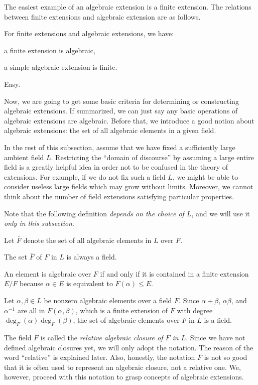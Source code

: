 \documentclass{../note}
\begin{document}
The easiest example of an algebraic extension is a finite extension.
The relations between finite extensions and algebraic extension are as follows.

\begin{prop}
For finite extensions and algebraic extensions, we have:
\begin{parts}
\item a finite extension is algebraic,
\item a simple algebraic extension is finite.
\end{parts}
\end{prop}
\begin{pf} Easy. \end{pf}

Now, we are going to get some basic criteria for determining or constructing algebraic extensions.
If summarized, we can just say any basic operations of algebraic extensions are algebraic.
Before that, we introduce a good notion about algebraic extensions: the set of all algebraic elements in a given field.

In the rest of this subsection, assume that we have fixed a sufficiently large ambient field $L$.
Restricting the ``domain of discourse'' by assuming a large entire field is a greatly helpful idea in order not to be confused in the theory of extensions.
For example, if we do not fix such a field $L$, we might be able to consider useless large fields which may grow without limits.
Moreover, we cannot think about the number of field extensions satisfying particular properties.

Note that the following definition \emph{depends on the choice of $L$}, and we will use it \emph{only in this subsection}.
\begin{defn}
Let $\bar F$ denote the set of all algebraic elements in $L$ over $F$.
\end{defn}
\begin{prop}
The set $\bar F$ of $F$ in $L$ is always a field.
\end{prop}
\begin{pf}
An element is algebraic over $F$ if and only if it is contained in a finite extension $E/F$ because $\alpha\in E$ is equivalent to $F(\alpha)\le E$.

Let $\alpha,\beta\in L$ be nonzero algebraic elements over a field $F$.
Since $\alpha+\beta$, $\alpha\beta$, and $\alpha^{-1}$ are all in $F(\alpha,\beta)$, which is a finite extension of $F$ with degree $\deg_F(\alpha)\deg_F(\beta)$, the set of algebraic elements over $F$ in $L$ is a field.
\end{pf}
\begin{rmk}
The field $\bar F$ is called the \emph{relative algebraic closure of $F$ in $L$}.
Since we have not defined algebraic closures yet, we will only adopt the notation.
The reason of the word ``relative'' is explained later.
Also, honestly, the notation $\bar F$ is not so good that it is often used to represent an algebraic closure, not a relative one.
We, however, proceed with this notation to grasp concepts of algebraic extensions.
\end{rmk}
\end{document}
